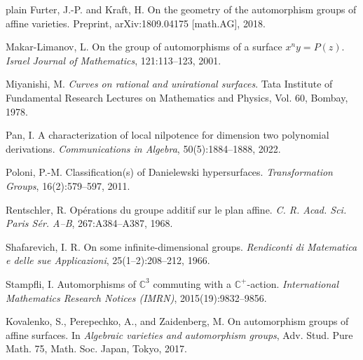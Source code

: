 \documentclass{article}
\begin{document}
{\begin{thebibliography}{plain}
Furter, J.-P. and Kraft, H. On the geometry of the automorphism groups of affine varieties. Preprint, arXiv:1809.04175 [math.AG], 2018.

Makar-Limanov, L. On the group of automorphisms of a surface $x^n y = P(z)$. \textit{Israel Journal of Mathematics}, 121:113--123, 2001.

Miyanishi, M. \textit{Curves on rational and unirational surfaces}. Tata Institute of Fundamental Research Lectures on Mathematics and Physics, Vol. 60, Bombay, 1978.

Pan, I. A characterization of local nilpotence for dimension two polynomial derivations. \textit{Communications in Algebra}, 50(5):1884--1888, 2022.

Poloni, P.-M. Classification(s) of Danielewski hypersurfaces. \textit{Transformation Groups}, 16(2):579--597, 2011.

Rentschler, R. Opérations du groupe additif sur le plan affine. \textit{C. R. Acad. Sci. Paris Sér. A–B}, 267:A384--A387, 1968.

Shafarevich, I. R. On some infinite-dimensional groups. \textit{Rendiconti di Matematica e delle sue Applicazioni}, 25(1–2):208--212, 1966.

Stampfli, I. Automorphisms of $\mathbb{C}^3$ commuting with a $\mathbb{C}^+$-action. \textit{International Mathematics Research Notices (IMRN)}, 2015(19):9832--9856.

Kovalenko, S., Perepechko, A., and Zaidenberg, M. On automorphism groups of affine surfaces. In \textit{Algebraic varieties and automorphism groups}, Adv. Stud. Pure Math. 75, Math. Soc. Japan, Tokyo, 2017.

\end{thebibliography}




}
\end{document}
